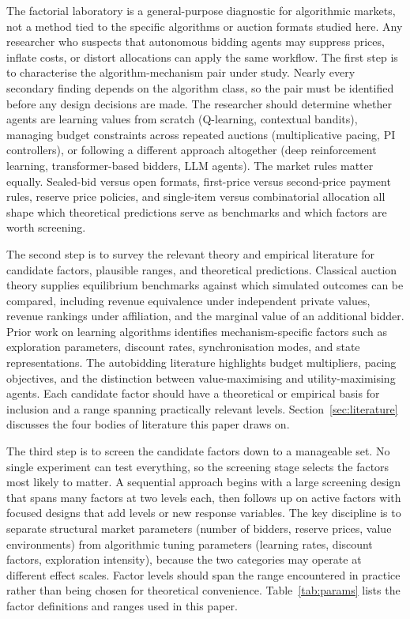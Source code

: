 The factorial laboratory is a general-purpose diagnostic for algorithmic markets, not a method tied to the specific algorithms or auction formats studied here. Any researcher who suspects that autonomous bidding agents may suppress prices, inflate costs, or distort allocations can apply the same workflow. The first step is to characterise the algorithm-mechanism pair under study. Nearly every secondary finding depends on the algorithm class, so the pair must be identified before any design decisions are made. The researcher should determine whether agents are learning values from scratch (Q-learning, contextual bandits), managing budget constraints across repeated auctions (multiplicative pacing, PI controllers), or following a different approach altogether (deep reinforcement learning, transformer-based bidders, LLM agents). The market rules matter equally. Sealed-bid versus open formats, first-price versus second-price payment rules, reserve price policies, and single-item versus combinatorial allocation all shape which theoretical predictions serve as benchmarks and which factors are worth screening.

The second step is to survey the relevant theory and empirical literature for candidate factors, plausible ranges, and theoretical predictions. Classical auction theory supplies equilibrium benchmarks against which simulated outcomes can be compared, including revenue equivalence under independent private values, revenue rankings under affiliation, and the marginal value of an additional bidder. Prior work on learning algorithms identifies mechanism-specific factors such as exploration parameters, discount rates, synchronisation modes, and state representations. The autobidding literature highlights budget multipliers, pacing objectives, and the distinction between value-maximising and utility-maximising agents. Each candidate factor should have a theoretical or empirical basis for inclusion and a range spanning practically relevant levels. Section~\ref{sec:literature} discusses the four bodies of literature this paper draws on.

The third step is to screen the candidate factors down to a manageable set. No single experiment can test everything, so the screening stage selects the factors most likely to matter. A sequential approach begins with a large screening design that spans many factors at two levels each, then follows up on active factors with focused designs that add levels or new response variables. The key discipline is to separate structural market parameters (number of bidders, reserve prices, value environments) from algorithmic tuning parameters (learning rates, discount factors, exploration intensity), because the two categories may operate at different effect scales. Factor levels should span the range encountered in practice rather than being chosen for theoretical convenience. Table~\ref{tab:params} lists the factor definitions and ranges used in this paper.

